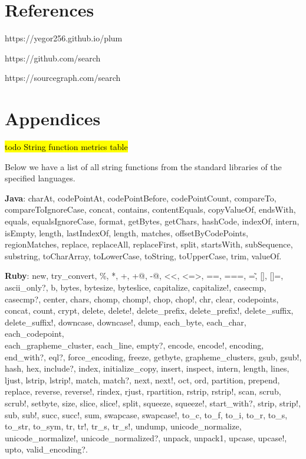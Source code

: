 \documentclass[anonymous,sigplan,review,11pt,nonacm,natbib=false]{acmart}
\begin{document}
    \section{References}

    https://yegor256.github.io/plum

    https://github.com/search

    https://sourcegraph.com/search

    \section{Appendices}

    \hl{todo String function metrics table}

    Below we have a list of all string functions from the standard libraries of the specified languages.

    \textbf{Java}: charAt, codePointAt, codePointBefore, codePointCount, compareTo, compareToIgnoreCase, concat, contains, contentEquals, copyValueOf, endsWith, equals, equalsIgnoreCase, format, getBytes, getChars, hashCode, indexOf, intern, isEmpty, length, lastIndexOf, length, matches, offsetByCodePoints, regionMatches, replace, replaceAll, replaceFirst, split, startsWith, subSequence, substring, toCharArray, toLowerCase, toString, toUpperCase, trim, valueOf.

    \textbf{Ruby}: new, try\_convert, \%, *, +, +@, -@, <<, <=>, ==, ===, =\~, [], []=, ascii\_only?, b, bytes, bytesize, byteslice, capitalize, capitalize!, casecmp, casecmp?, center, chars, chomp, chomp!, chop, chop!, chr, clear, codepoints, concat, count, crypt, delete, delete!, delete\_prefix, delete\_prefix!, delete\_suffix, delete\_suffix!, downcase, downcase!, dump, each\_byte, each\_char, each\_codepoint, \\ each\_grapheme\_cluster, each\_line, empty?, encode, encode!, encoding, end\_with?, eql?, force\_encoding, freeze, getbyte, grapheme\_clusters, gsub, gsub!, hash, hex, include?, index, initialize\_copy, insert, inspect, intern, length, lines, ljust, lstrip, lstrip!, match, match?, next, next!, oct, ord, partition, prepend, replace, reverse, reverse!, rindex, rjust, rpartition, rstrip, rstrip!, scan, scrub, scrub!, setbyte, size, slice, slice!, split, squeeze, squeeze!, start\_with?, strip, strip!, sub, sub!, succ, succ!, sum, swapcase, swapcase!, to\_c, to\_f, to\_i, to\_r, to\_s, to\_str, to\_sym, tr, tr!, tr\_s, tr\_s!, undump, unicode\_normalize, unicode\_normalize!, unicode\_normalized?, unpack, unpack1, upcase, upcase!, upto, valid\_encoding?.
\end{document}
